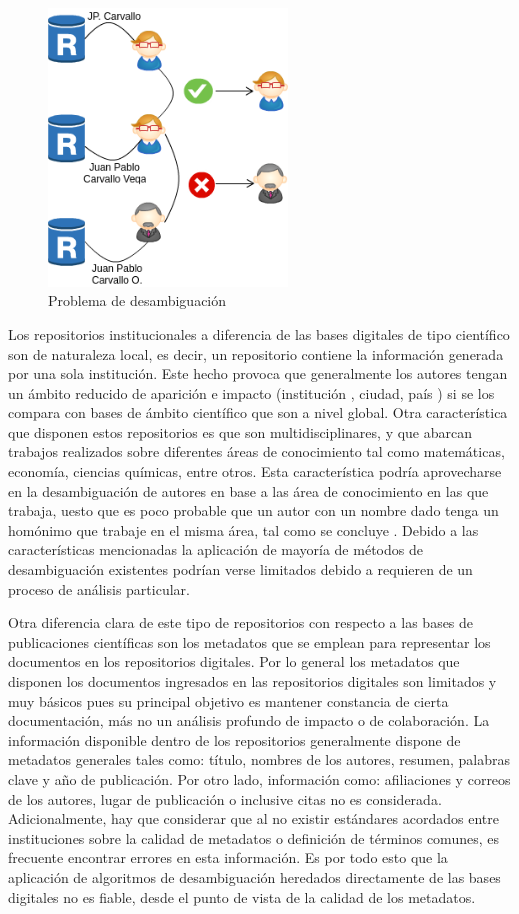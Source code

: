 \documentclass[conference]{IEEEtran}
\begin{document}
\begin{figure}[!t]
\centering
\includegraphics[width=2.5in]{problema}
\caption{Problema de desambiguación}
\label{fig:problema_desambiguacion}
\end{figure}

Los repositorios institucionales a diferencia de las bases digitales de tipo científico  son de naturaleza local, es decir, un repositorio contiene la información generada por una sola institución. Este hecho provoca que generalmente los autores tengan un ámbito reducido de aparición e impacto (institución , ciudad, país ) si se los compara con bases de  ámbito científico que son a nivel global. Otra característica que disponen estos repositorios es que son multidisciplinares, y que abarcan trabajos realizados sobre diferentes áreas de conocimiento tal como matemáticas, economía, ciencias químicas, entre otros. Esta característica  podría aprovecharse en la desambiguación de autores en base a las área de conocimiento en las que trabaja, uesto que es poco probable que un autor con un nombre dado tenga un homónimo que trabaje en el misma área, tal como se concluye \cite{journals/sigmod/FerreiraGL12}.  Debido a las características mencionadas la aplicación de mayoría de métodos de desambiguación existentes podrían verse limitados debido a  requieren de un proceso de análisis particular.

Otra diferencia clara de este tipo de repositorios con respecto a las bases de publicaciones científicas son los metadatos que se emplean para representar los documentos en los repositorios digitales. Por lo general los metadatos que disponen los documentos ingresados en las repositorios digitales son limitados y muy básicos pues su principal objetivo es mantener constancia de cierta documentación, más no un análisis profundo de impacto o de colaboración. La información disponible dentro de los repositorios generalmente dispone de  metadatos generales tales como: título, nombres de los autores, resumen, palabras clave y año de publicación. Por otro lado, información como: afiliaciones y correos de los autores, lugar de publicación o inclusive citas no es considerada. Adicionalmente, hay que considerar que al no existir estándares acordados entre instituciones sobre la calidad de metadatos o definición de términos comunes, es frecuente encontrar errores en esta información. Es por todo esto que la aplicación de algoritmos de desambiguación heredados directamente de las bases digitales no es fiable, desde el punto de vista de la calidad de los metadatos.
\end{document}
